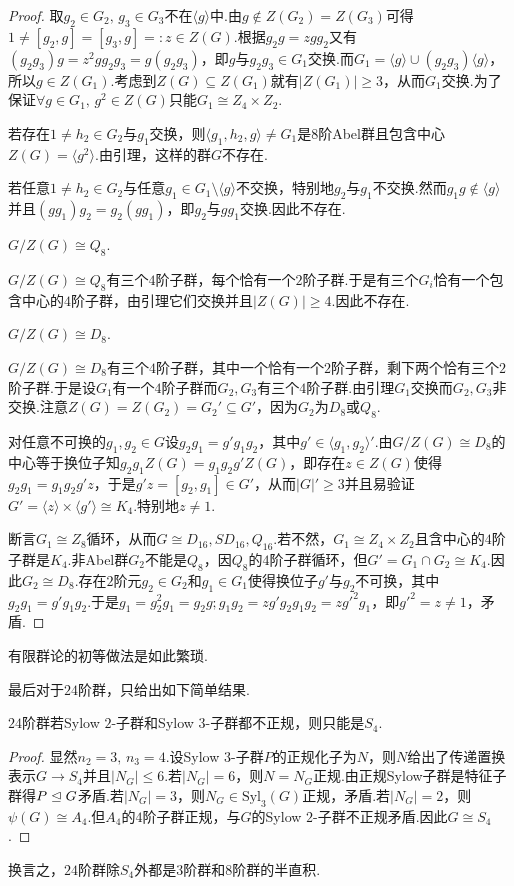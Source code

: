 \begin{proof}
	取$g_2\in G_2,\,g_3\in G_3$不在$\langle g\rangle $中.由$g\notin Z(G_2)=Z(G_3)$可得$1\ne[g_2,g]=[g_3,g]=:z\in Z(G)$.根据$g_2g=zgg_2$又有$(g_2g_3)g=z^2gg_2g_3=g(g_2g_3)$，即$g$与$g_2g_3\in G_1$交换.而$G_1=\langle g\rangle\cup(g_2g_3)\langle g\rangle $，所以$g\in Z(G_1)$.考虑到$Z(G)\subseteq Z(G_1)$就有$|Z(G_1)|\ge 3$，从而$G_1$交换.为了保证$\forall g\in G_1,\,g^2\in Z(G)$只能$G_1\cong Z_4\times Z_2$.

	若存在$1\ne h_2\in G_2$与$g_1$交换，则$\langle g_1,h_2,g\rangle\ne G_1$是$8$阶Abel群且包含中心$Z(G)=\langle g^2\rangle $.由引理，这样的群$G$不存在.

	若任意$1\ne h_2\in G_2$与任意$g_1\in G_1\setminus\langle g\rangle $不交换，特别地$g_2$与$g_1$不交换.然而$g_1g\notin\langle g\rangle $并且$(gg_1)g_2=g_2(gg_1)$，即$g_2$与$gg_1$交换.因此不存在.

	{\color{IndianRed}\bullet$G/Z(G)\cong Q_8$}.

	$G/Z(G)\cong Q_8$有三个$4$阶子群，每个恰有一个$2$阶子群.于是有三个$G_i$恰有一个包含中心的$4$阶子群，由引理它们交换并且$|Z(G)|\ge 4$.因此不存在.

	{\color{IndianRed}\bullet$G/Z(G)\cong D_8$}.

	$G/Z(G)\cong D_8$有三个$4$阶子群，其中一个恰有一个$2$阶子群，剩下两个恰有三个$2$阶子群.于是设$G_1$有一个$4$阶子群而$G_2,G_3$有三个$4$阶子群.由引理$G_1$交换而$G_2,G_3$非交换.注意$Z(G)=Z(G_2)=G_2'\subseteq G'$，因为$G_2$为$D_8$或$Q_8$.

	对任意不可换的$g_1,g_2\in G$设$g_2g_1=g'g_1g_2$，其中$g'\in\langle g_1,g_2\rangle'$.由$G/Z(G)\cong D_8$的中心等于换位子知$g_2g_1Z(G)=g_1g_2g'Z(G)$，即存在$z\in Z(G)$使得$g_2g_1=g_1g_2g'z$，于是$g'z=[g_2,g_1]\in G'$，从而$|G|'\ge 3$并且易验证$G'=\langle z\rangle\times\langle g'\rangle\cong K_4$.特别地$z\ne 1$.

	断言$G_1\cong Z_8$循环，从而$G\cong D_{16},SD_{16},Q_{16}$.若不然，$G_1\cong Z_4\times Z_2$且含中心的$4$阶子群是$K_4$.非Abel群$G_2$不能是$Q_8$，因$Q_8$的$4$阶子群循环，但$G'=G_1\cap G_2\cong K_4$.因此$G_2\cong D_8$.存在$2$阶元$g_2\in G_2$和$g_1\in G_1$使得换位子$g'$与$g_2$不可换，其中$g_2g_1=g'g_1g_2$.于是$g_1=g_2^2g_1=g_2g;g_1g_2=zg'g_2g_1g_2=zg'^2g_1$，即$g'^2=z\ne 1$，矛盾.
\end{proof}
\begin{remark}
	有限群论的初等做法是如此繁琐.
\end{remark}

最后对于$24$阶群，只给出如下简单结果.
\begin{prop}
	$24$阶群若Sylow $2$-子群和Sylow $3$-子群都不正规，则只能是$S_4$.\hypertarget{prop:24OrderGroup}{}
\end{prop}
\begin{proof}
	显然$n_2=3,\,n_3=4$.设Sylow $3$-子群$P$的正规化子为$N$，则$N$给出了传递置换表示$G\to S_4$并且$|N_G|\le 6$.若$|N_G|=6$，则$N=N_G$正规.由正规Sylow子群是特征子群得$P\trianglelefteq G$矛盾.若$|N_G|=3$，则$N_G\in\mathrm{Syl}_3(G)$正规，矛盾.若$|N_G|=2$，则$\psi(G)\cong A_4$.但$A_4$的$4$阶子群正规，与$G$的Sylow $2$-子群不正规矛盾.因此$G\cong S_4$.
\end{proof}
\begin{remark}
	换言之，$24$阶群除$S_4$外都是$3$阶群和$8$阶群的半直积.
\end{remark}

